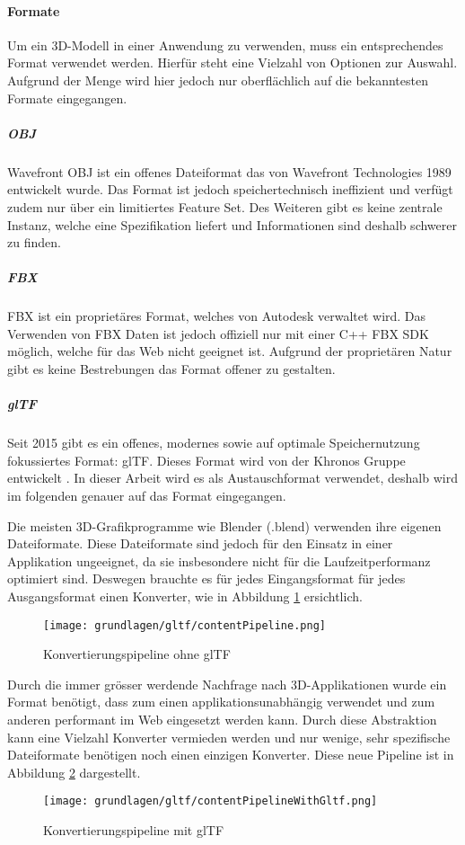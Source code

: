 \paragraph{Formate}
Um ein 3D-Modell in einer Anwendung zu verwenden, muss ein entsprechendes Format verwendet werden. Hierfür steht eine Vielzahl von Optionen zur Auswahl. Aufgrund der Menge wird hier jedoch nur oberflächlich auf die bekanntesten Formate eingegangen.

\subparagraph{OBJ}
Wavefront OBJ ist ein offenes Dateiformat das von Wavefront Technologies 1989 entwickelt wurde. Das Format ist jedoch speichertechnisch ineffizient und verfügt zudem nur über ein limitiertes Feature Set. Des Weiteren gibt es keine zentrale Instanz, welche eine Spezifikation liefert und Informationen sind deshalb schwerer zu finden. \cite{objSpec}

\subparagraph{FBX}
FBX ist ein proprietäres Format, welches von Autodesk verwaltet wird. Das Verwenden von FBX Daten ist jedoch offiziell nur mit einer C++ FBX SDK möglich, welche für das Web nicht geeignet ist. Aufgrund der proprietären Natur gibt es keine Bestrebungen das Format offener zu gestalten.

\subparagraph{glTF}
Seit 2015 gibt es ein offenes, modernes sowie auf optimale Speichernutzung fokussiertes Format: glTF. Dieses Format wird von der Khronos Gruppe entwickelt \cite{gltf1Spec}. In dieser Arbeit wird es als Austauschformat verwendet, deshalb wird im folgenden genauer auf das Format eingegangen.

Die meisten 3D-Grafikprogramme wie Blender (.blend) verwenden ihre eigenen Dateiformate. Diese Dateiformate sind jedoch für den Einsatz in einer Applikation ungeeignet, da sie insbesondere nicht für die Laufzeitperformanz optimiert sind. Deswegen brauchte es für jedes Eingangsformat für jedes Ausgangsformat einen Konverter, wie in Abbildung \ref{fig:contentPipelineWithoutGltf} ersichtlich.

\begin{figure}[H]
  \centering
  \texttt{[image: grundlagen/gltf/contentPipeline.png]}
  \caption{Konvertierungspipeline ohne glTF \cite{gltfTutorialIntro}}
  \label{fig:contentPipelineWithoutGltf}
\end{figure}

Durch die immer grösser werdende Nachfrage nach 3D-Applikationen wurde ein Format benötigt, dass zum einen applikationsunabhängig verwendet und zum anderen performant im Web eingesetzt werden kann.
Durch diese Abstraktion kann eine Vielzahl Konverter vermieden werden und nur wenige, sehr spezifische Dateiformate benötigen noch einen einzigen Konverter. Diese neue Pipeline ist in Abbildung \ref{fig:contentPipelineWithGltf} dargestellt. \cite{gltfTutorialIntro}
\begin{figure}[H]
  \centering
  \texttt{[image: grundlagen/gltf/contentPipelineWithGltf.png]}
  \caption{Konvertierungspipeline mit glTF \cite{gltfTutorialIntro}}
  \label{fig:contentPipelineWithGltf}
\end{figure}

